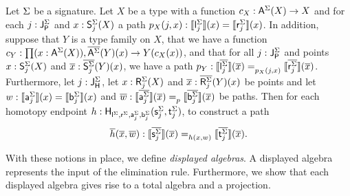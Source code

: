 \begin{problem}
\label{prob:homot_dact}
Let $\sign$ be a signature.
Let $X$ be a type with a function $c_X : \polyAct{\pointconstr[\sign]}{X} \rightarrow X$
and for each $j : \pathlabel[\sign]$ and $x : \polyAct{\patharg[\sign]_j}{X}$ a path $p_X(j, x) : \semE{\pathleft[\sign]_j}(x) = \semE{\pathright[\sign]_j}(x)$.
In addition, suppose that $Y$ is a type family on $X$,
that we have a function $c_Y : \depprod{(x : \polyAct{\pointconstr[\sign]}{X})}{\polyDact{\pointconstr[\sign]}{Y}(x) \rightarrow Y(c_X(x))}$,
and that for all $j  : \pathlabel[\sign]$ and points $x : \polyAct{\patharg[\sign]_j}{X}$ and $\xx : \polyDact{\patharg[\sign]_j}{Y}(x)$,
we have a path $p_Y : \pathover{p_X(j, x)}{\pathendpointDact{\pathleft[\sign]_j}{\xx}}{\pathendpointDact{\pathright[\sign]_j}{\xx}}$.
Furthermore, let $j : \homotlabel[\sign]$, let $x : \homotpointarg[\sign]_j(X)$ and $\xx : \polyDact{\homotpointarg[\sign]_j}{Y}(x)$ be points
and let $w : \semE{\pathargleft[\sign]_j}(x) = \semE{\pathargright[\sign]_j}(x)$
and $\disp{w} : \pathover{p}{\pathendpointDact{\pathargleft[\sign]_j}{\xx}}{\pathendpointDact{\pathargright[\sign]_j}{\xx}}$
be paths.
Then for each homotopy endpoint $h : \homotendpoint{\pathleft[\sign]}{\pathright[\sign]}{\pathargleft[\sign]_j}{\pathargright[\sign]_j}{\homotpathleft[\sign]_j}{\homotpathright[\sign]_j}$, 
to construct a path
\[
\homotendpointDact{h}{\xx, \disp{w}} : \pathover{\homotendpointAct{h}{x, w}}{\pathendpointDact{\homotpathleft[\sign]_j}{\xx}}{\pathendpointDact{\homotpathright[\sign]_j}{\xx}}.
\]
\end{problem}

With these notions in place, we define \emph{displayed algebras}.
A displayed algebra represents the input of the elimination rule.
Furthermore, we show that each displayed algebra gives rise to a total algebra and a projection.


